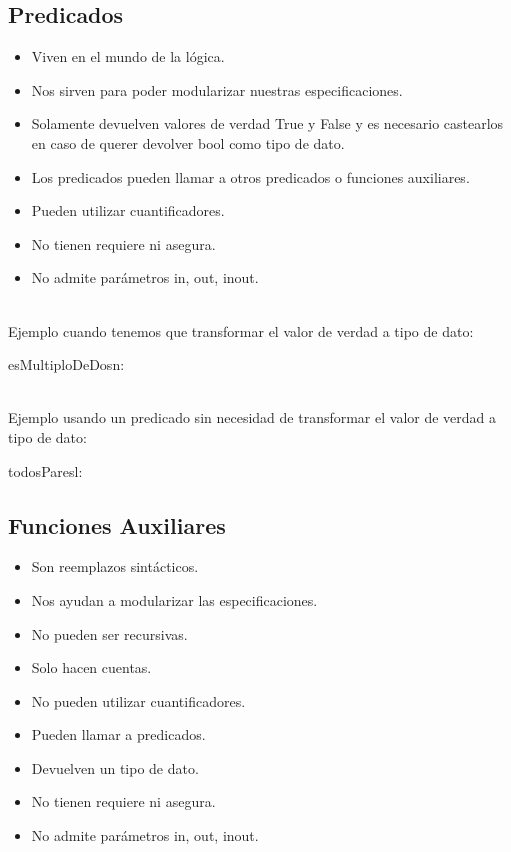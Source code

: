 \documentclass[10pt,a4paper]{article}
\begin{document}
\subsection*{Predicados}
\begin{itemize}
    \item Viven en el mundo de la lógica. 
    \item Nos sirven para poder modularizar nuestras especificaciones. 
    \item Solamente devuelven valores de verdad True y False y es necesario castearlos en caso de querer devolver bool como tipo de dato.
    \item Los predicados pueden llamar a otros predicados o funciones auxiliares.
    \item Pueden utilizar cuantificadores.
    \item No tienen requiere ni asegura.
    \item No admite parámetros in, out, inout.
\end{itemize}

\leavevmode
\\
Ejemplo cuando tenemos que transformar el valor de verdad a tipo de dato: 
\leavevmode
\\

\begin{proc}{esMultiploDeDos}{\In n: \ent}{\bool}
    \requiere{\True}
\end{proc}
\leavevmode
\\ 
Ejemplo usando un predicado sin necesidad de transformar el valor de verdad a tipo de dato: 

\leavevmode
{}

\begin{proc}{todosPares}{\In l: \TLista{\ent}}{\bool}
\end{proc}
\newpage
\subsection*{Funciones Auxiliares}
\begin{itemize}
    \item Son reemplazos sintácticos. 
    \item Nos ayudan a modularizar las especificaciones.
    \item No pueden ser recursivas.
    \item Solo hacen cuentas.
    \item No pueden utilizar cuantificadores.
    \item Pueden llamar a predicados.
    \item Devuelven un tipo de dato.
    \item No tienen requiere ni asegura.
    \item No admite parámetros in, out, inout.
\end{itemize}
\end{document}
